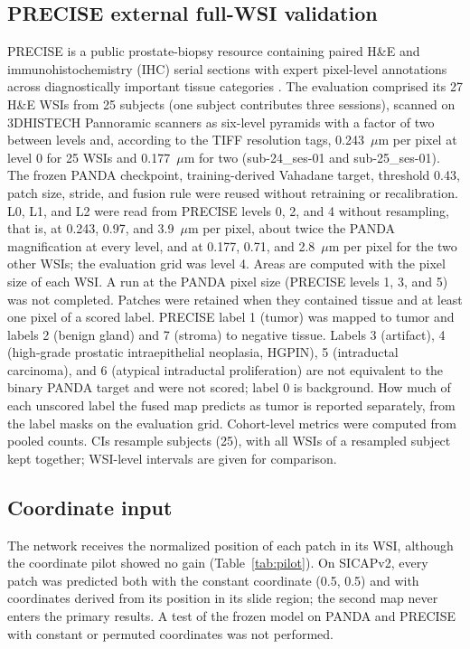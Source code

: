 \documentclass[10pt,letterpaper]{article}
\begin{document}
\subsection*{PRECISE external full-WSI validation}
PRECISE is a public prostate-biopsy resource containing paired H\&E and immunohistochemistry (IHC) serial sections with expert pixel-level annotations across diagnostically important tissue categories \cite{bib46,bibPRECISEdata}. The evaluation comprised its 27 H\&E WSIs from 25 subjects (one subject contributes three sessions), scanned on 3DHISTECH Pannoramic scanners as six-level pyramids with a factor of two between levels and, according to the TIFF resolution tags, 0.243~$\mu$m per pixel at level 0 for 25 WSIs and 0.177~$\mu$m for two (sub-24\_ses-01 and sub-25\_ses-01). The frozen PANDA checkpoint, training-derived Vahadane target, threshold 0.43, patch size, stride, and fusion rule were reused without retraining or recalibration. L0, L1, and L2 were read from PRECISE levels 0, 2, and 4 without resampling, that is, at 0.243, 0.97, and 3.9~$\mu$m per pixel, about twice the PANDA magnification at every level, and at 0.177, 0.71, and 2.8~$\mu$m per pixel for the two other WSIs; the evaluation grid was level 4. Areas are computed with the pixel size of each WSI. A run at the PANDA pixel size (PRECISE levels 1, 3, and 5) was not completed. Patches were retained when they contained tissue and at least one pixel of a scored label. PRECISE label 1 (tumor) was mapped to tumor and labels 2 (benign gland) and 7 (stroma) to negative tissue. Labels 3 (artifact), 4 (high-grade prostatic intraepithelial neoplasia, HGPIN), 5 (intraductal carcinoma), and 6 (atypical intraductal proliferation) are not equivalent to the binary PANDA target and were not scored; label 0 is background. How much of each unscored label the fused map predicts as tumor is reported separately, from the label masks on the evaluation grid. Cohort-level metrics were computed from pooled counts. CIs resample subjects (25), with all WSIs of a resampled subject kept together; WSI-level intervals are given for comparison.

\subsection*{Coordinate input}
The network receives the normalized position of each patch in its WSI, although the coordinate pilot showed no gain (Table~\ref{tab:pilot}). On SICAPv2, every patch was predicted both with the constant coordinate (0.5, 0.5) and with coordinates derived from its position in its slide region; the second map never enters the primary results. A test of the frozen model on PANDA and PRECISE with constant or permuted coordinates was not performed.
\end{document}
